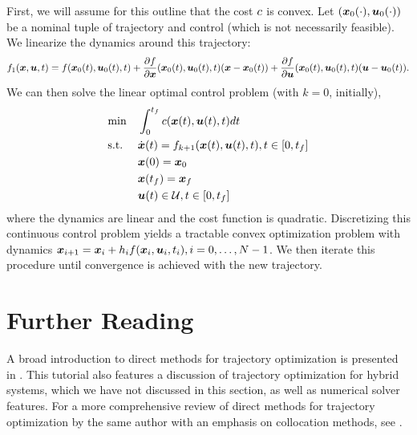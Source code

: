 First, we will assume for this outline that the cost $c$ is convex. Let $(\bm{x}_0(\cdot),\bm{u}_0(\cdot))$ be a nominal tuple of trajectory and control (which is not necessarily feasible). We linearize the dynamics around this trajectory:
\begin{equation}
    f_1(\bm{x},\bm{u},t) = f(\bm{x}_0(t),\bm{u}_0(t),t) + \frac{\partial f}{\partial \bm{x}}(\bm{x}_0(t), \bm{u}_0(t), t) (\bm{x} - \bm{x}_0(t)) + \frac{\partial f}{\partial \bm{u}}(\bm{x}_0(t), \bm{u}_0(t), t) (\bm{u} - \bm{u}_0(t)).
\end{equation}
We can then solve the linear optimal control problem (with $k=0$, initially),
\begin{equation}
\begin{aligned}
\label{eq:ocp}
& {\min} & & \int_{0}^{t_f} c(\bm{x}(t),\bm{u}(t),t) dt\\
& \textrm{s.t.} & & \dot{\bm{x}}(t) = f_{k+1}(\bm{x}(t),\bm{u}(t),t), t \in [0,t_f]\\
& & & \bm{x}(0) = \bm{x}_0\\
& & & \bm{x}(t_f) = \bm{x}_f\\
& & & \bm{u}(t) \in \mathcal{U}, t \in [0,t_f]
\end{aligned}
\end{equation}
where the dynamics are linear and the cost function is quadratic. Discretizing this continuous control problem yields a tractable convex optimization problem with dynamics $\bm{x}_{i+1} = \bm{x}_i + h_i f(\bm{x}_i,\bm{u}_i,t_i), i=0, \ldots, N-1$. We then iterate this procedure until convergence is achieved with the new trajectory.




\section{Further Reading}

A broad introduction to direct methods for trajectory optimization is presented in \cite{kelly2017transcription}. This tutorial also features a discussion of trajectory optimization for hybrid systems, which we have not discussed in this section, as well as numerical solver features. For a more comprehensive review of direct methods for trajectory optimization by the same author with an emphasis on collocation methods, see \cite{kelly2017introduction}.